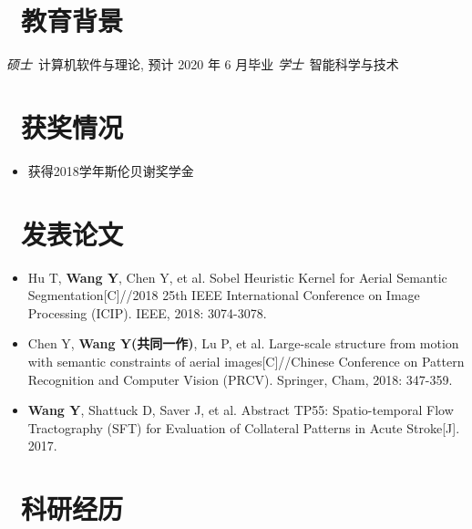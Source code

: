 \documentclass{resume}
\begin{document}


 
\section{\faGraduationCap\  教育背景}
\textit{硕士}\ 计算机软件与理论, 预计 2020 年 6 月毕业
\textit{学士}\ 智能科学与技术


\section{\faHeartO\ 获奖情况}

\begin{itemize}[parsep=0.5ex]
	\item 获得2018学年斯伦贝谢奖学金
\end{itemize}

\section{\faBookmark\ 发表论文}
\begin{itemize}[parsep=0.5ex]
	\item Hu T, \textbf{Wang Y}, Chen Y, et al. Sobel Heuristic Kernel for Aerial Semantic Segmentation[C]//2018 25th IEEE International Conference on Image Processing (ICIP). IEEE, 2018: 3074-3078.
	\item Chen Y, \textbf{Wang Y(共同一作)}, Lu P, et al. Large-scale structure from motion with semantic constraints of aerial images[C]//Chinese Conference on Pattern Recognition and Computer Vision (PRCV). Springer, Cham, 2018: 347-359.
	\item \textbf{Wang Y}, Shattuck D, Saver J, et al. Abstract TP55: Spatio-temporal Flow Tractography (SFT) for Evaluation of Collateral Patterns in Acute Stroke[J]. 2017.
\end{itemize}


\section{\faFlask\ 科研经历}
\end{document}

